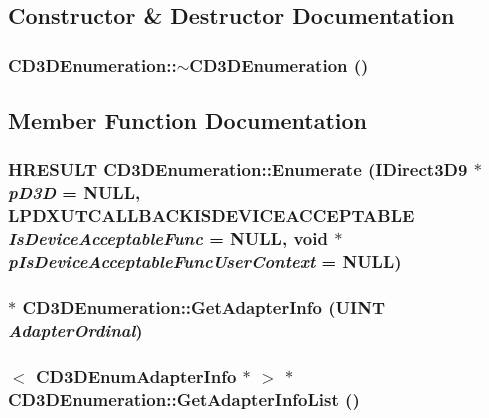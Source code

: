 \subsection{Constructor \& Destructor Documentation}
\hypertarget{class_c_d3_d_enumeration_adf74c5d5a66b22c849702ae86080076e}{
\subsubsection[{$\sim$CD3DEnumeration}]{\setlength{\rightskip}{0pt plus 5cm}CD3DEnumeration::$\sim$CD3DEnumeration ()}}
\label{class_c_d3_d_enumeration_adf74c5d5a66b22c849702ae86080076e}


\subsection{Member Function Documentation}
\hypertarget{class_c_d3_d_enumeration_aa5114cc4e4ca9c064b27b1284fc1322a}{
\subsubsection[{Enumerate}]{\setlength{\rightskip}{0pt plus 5cm}HRESULT CD3DEnumeration::Enumerate (IDirect3D9 $\ast$ {\em pD3D} = {\ttfamily NULL}, \/  {\bf LPDXUTCALLBACKISDEVICEACCEPTABLE} {\em IsDeviceAcceptableFunc} = {\ttfamily NULL}, \/  void $\ast$ {\em pIsDeviceAcceptableFuncUserContext} = {\ttfamily NULL})}}
\label{class_c_d3_d_enumeration_aa5114cc4e4ca9c064b27b1284fc1322a}
\hypertarget{class_c_d3_d_enumeration_a3a817a286d0ffc931a2ba3702149b6ee}{
\subsubsection[{GetAdapterInfo}]{ $\ast$ CD3DEnumeration::GetAdapterInfo (UINT {\em AdapterOrdinal})}}
\label{class_c_d3_d_enumeration_a3a817a286d0ffc931a2ba3702149b6ee}
\hypertarget{class_c_d3_d_enumeration_a4ba124e20eacf7ae3e4ec992b0cca7b5}{
\subsubsection[{GetAdapterInfoList}]{$<$ {\bf CD3DEnumAdapterInfo} $\ast$ $>$ $\ast$ CD3DEnumeration::GetAdapterInfoList ()}}
